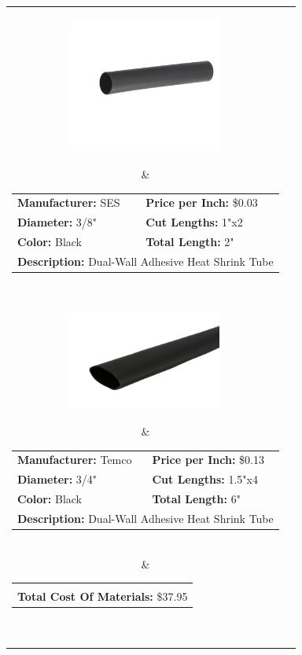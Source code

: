 \documentclass[12pt,letterpaper]{article}
\begin{document}
\begin{longtable}{c l}
\parbox[c]{5cm}{\includegraphics[width=5cm]{3by8shrinktube.jpg} }
& \begin{tabular}{l l}
\textbf{Manufacturer:} SES & \textbf{Price per Inch:} \$0.03 \\
\textbf{Diameter:} 3/8" & \textbf{Cut Lengths:} 1"x2 \\
\textbf{Color:} Black  & \textbf{Total Length:} 2" \\
\multicolumn{2}{p{10cm}}{\textbf{Description:} Dual-Wall Adhesive Heat Shrink Tube } \\
\end{tabular} \\

\parbox[c]{5cm}{\includegraphics[width=5cm]{3by4shrinktube.jpg} }
& \begin{tabular}{l l}
\textbf{Manufacturer:} Temco & \textbf{Price per Inch:} \$0.13 \\
\textbf{Diameter:} 3/4" & \textbf{Cut Lengths:} 1.5"x4 \\
\textbf{Color:} Black  & \textbf{Total Length:} 6" \\
\multicolumn{2}{p{10cm}}{\textbf{Description:} Dual-Wall Adhesive Heat Shrink Tube } \\
\end{tabular} \\

& 
\begin{tabular}{l} 
\hline \\
\textbf{Total Cost Of Materials:} \$37.95 \\
\end{tabular} \\

\end{longtable}
\end{document}
